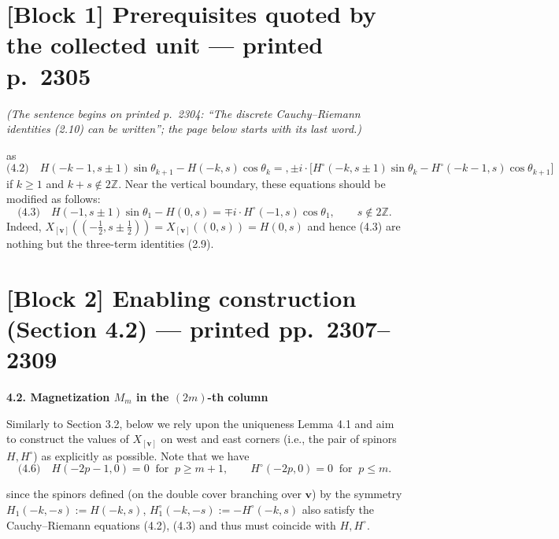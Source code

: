 \documentclass[11pt]{article}
\newcommand{\eql}[1]{\text{(#1)}\quad}
\newcommand{\bvv}{\mathbf{v}}
\begin{document}
\section*{[Block 1] Prerequisites quoted by the collected unit --- printed p.~2305}

\noindent\emph{(The sentence begins on printed p.~2304: ``The discrete
Cauchy--Riemann identities (2.10) can be written''; the page below starts
with its last word.)}

as
\[
\eql{4.2} H(-k-1,s\pm1)\sin\theta_{k+1} - H(-k,s)\cos\theta_k
= ,\pm i\cdot\bigl[H^{\circ}(-k,s\pm1)\sin\theta_k - H^{\circ}(-k-1,s)\cos\theta_{k+1}\bigr]
\]
if $k \geqslant 1$ and $k+s \notin 2\mathbb{Z}$. Near the vertical boundary,
these equations should be modified as follows:
\[
\eql{4.3} H(-1,s\pm1)\sin\theta_1 - H(0,s) = \mp i\cdot H^{\circ}(-1,s)\cos\theta_1,
\qquad s \notin 2\mathbb{Z}.
\]
Indeed, $X_{[\bvv]}((-\frac12,s\pm\frac12)) = X_{[\bvv]}((0,s)) = H(0,s)$ and
hence (4.3) are nothing but the three-term identities (2.9).

\section*{[Block 2] Enabling construction (Section 4.2) --- printed pp.~2307--2309}

\begin{center}
\textbf{4.2. Magnetization $M_m$ in the $(2m)$-th column}
\end{center}

Similarly to Section 3.2, below we rely upon the uniqueness Lemma 4.1 and aim
to construct the values of $X_{[\bvv]}$ on west and east corners (i.e., the
pair of spinors $H,H^{\circ}$) as explicitly as possible. Note that we have
\[
\eql{4.6} H(-2p-1,0) = 0 \ \text{ for } \ p \geqslant m+1,
\qquad H^{\circ}(-2p,0) = 0 \ \text{ for } \ p \leqslant m.
\]

since the spinors defined (on the double cover branching over $\bvv$) by the
symmetry $H_1(-k,-s) := H(-k,s)$, $H_1^{\circ}(-k,-s) := -H^{\circ}(-k,s)$
also satisfy the Cauchy--Riemann equations (4.2), (4.3) and thus must
coincide with $H,H^{\circ}$.
\end{document}
